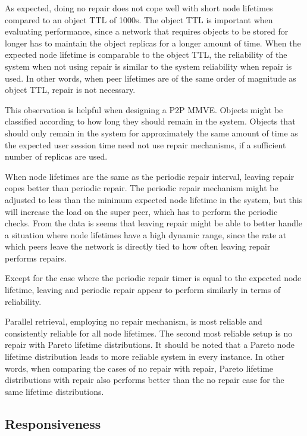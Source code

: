 As expected, doing no repair does not cope well with short node lifetimes compared to an object TTL of 1000s. The object TTL is important when evaluating performance, since a network that requires objects to be stored for longer has to maintain the object replicas for a longer amount of time. When the expected node lifetime is comparable to the object TTL, the reliability of the system when not using repair is similar to the system reliability when repair is used. In other words, when peer lifetimes are of the same order of magnitude as object TTL, repair is not necessary.

This observation is helpful when designing a P2P MMVE. Objects might be classified according to how long they should remain in the system. Objects that should only remain in the system for approximately the same amount of time as the expected user session time need not use repair mechanisms, if a sufficient number of replicas are used.

When node lifetimes are the same as the periodic repair interval, leaving repair copes better than periodic repair. The periodic repair mechanism might be adjusted to less than the minimum expected node lifetime in the system, but this will increase the load on the super peer, which has to perform the periodic checks. From the data is seems that leaving repair might be able to better handle a situation where node lifetimes have a high dynamic range, since the rate at which peers leave the network is directly tied to how often leaving repair performs repairs.

Except for the case where the periodic repair timer is equal to the expected node lifetime, leaving and periodic repair appear to perform similarly in terms of reliability.

Parallel retrieval, employing no repair mechanism, is most reliable and consistently reliable for all node lifetimes. The second most reliable setup is no repair with Pareto lifetime distributions. It should be noted that a Pareto node lifetime distribution leads to more reliable system in every instance. In other words, when comparing the cases of no repair with repair, Pareto lifetime distributions with repair also performs better than the no repair case for the same lifetime distributions.

\subsection{Responsiveness}

